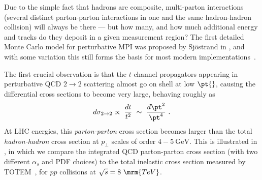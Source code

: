 Due to the simple fact that hadrons are composite, multi-parton
interactions (several distinct parton-parton interactions in one and
the same hadron-hadron collision) will always be there --- but how
many, and how much additional energy and tracks do they deposit in a
given measurement region? The first detailed Monte Carlo model for 
perturbative MPI was proposed by Sj\"ostrand in 
\cite{Sjostrand:1987su}, and with some variation 
this still forms the basis for most modern
implementations~\cite{Buckley:2011ms}.

The first crucial observation is that the $t$-channel propagators
appearing in perturbative QCD $2\to2$ scattering
almost go on shell at low $\pt{}$, causing the differential cross 
sections to become very large, behaving roughly as
\begin{equation}
d \sigma_{2\to 2} \propto \ 
\frac{d{t} }{{t}^2} \ \sim \ 
 \frac{{d}{\pt^2}}{\pt^4}~. \label{eq:dpt4}
\end{equation}
At LHC energies, this \emph{parton-parton} cross section
becomes larger than the total \emph{hadron-hadron} cross section at
$p_\perp$ scales of order $4-5~\mbox{GeV}$. This is illustrated in
\figRef{fig:sigmaQCD}, in which we compare the integrated QCD
parton-parton cross 
section (with two different $\alpha_s$ and PDF choices) to the total
inelastic cross section measured by TOTEM~\cite{Antchev:2013paa}, for
$pp$ collisions at $\sqrt{s} =8~\mrm{TeV}$.
